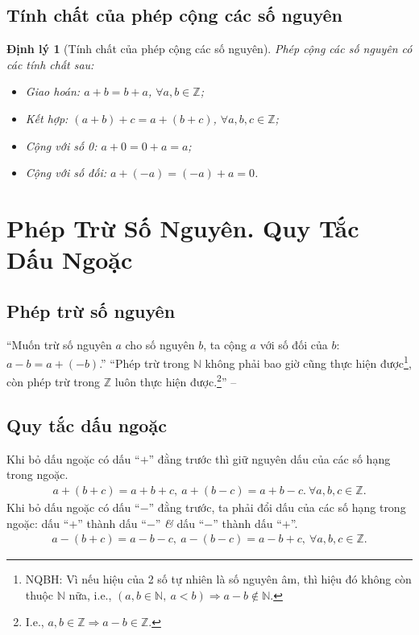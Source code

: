 \documentclass[oneside]{book}
\numberwithin{equation}{section}
\newtheorem{dinhly}{Định lý}[section]
\begin{document}
\subsection{Tính chất của phép cộng các số nguyên}

\begin{dinhly}[Tính chất của phép cộng các số nguyên]
	Phép cộng các số nguyên có các tính chất sau:
	\begin{itemize}
		\item Giao hoán: $a + b = b + a$, $\forall a,b\in\mathbb{Z}$;
		\item Kết hợp: $(a + b) + c = a + (b + c)$, $\forall a,b,c\in\mathbb{Z}$;
		\item Cộng với số 0: $a + 0 = 0 + a = a$;
		\item Cộng với số đối: $a + (-a) = (-a) + a = 0$.
	\end{itemize}
\end{dinhly}


\section{Phép Trừ Số Nguyên. Quy Tắc Dấu Ngoặc}

\subsection{Phép trừ số nguyên}
``Muốn trừ số nguyên $a$ cho số nguyên $b$, ta cộng $a$ với số đối của $b$: $a - b = a + (-b)$.'' ``Phép trừ trong $\mathbb{N}$ không phải bao giờ cũng thực hiện được\footnote{NQBH: Vì nếu hiệu của 2 số tự nhiên là số nguyên âm, thì hiệu đó không còn thuộc $\mathbb{N}$ nữa, i.e., $(a,b\in\mathbb{N},\ a < b)\Rightarrow a - b\notin\mathbb{N}$.}, còn phép trừ trong $\mathbb{Z}$ luôn thực hiện được.\footnote{I.e., $a,b\in\mathbb{Z}\Rightarrow a - b\in\mathbb{Z}$.}'' -- \cite[p. 76]{Thai_Anh_Dat_Ha_Loan_Nam_Quang_Toan_6_tap_1}

\subsection{Quy tắc dấu ngoặc}
Khi bỏ dấu ngoặc có dấu ``$+$'' đằng trước thì giữ nguyên dấu của các số hạng trong ngoặc.
\begin{align*}
	a + (b + c) = a + b + c,\ a + (b - c) = a + b - c.\ \forall a,b,c\in\mathbb{Z}.
\end{align*}
Khi bỏ dấu ngoặc có dấu ``$-$'' đằng trước, ta phải đổi dấu của các số hạng trong ngoặc: dấu ``$+$'' thành dấu ``$-$'' \textit{\&} dấu ``$-$'' thành dấu ``$+$''.
\begin{align*}
	a - (b + c) = a - b - c,\ a - (b - c) = a - b + c,\ \forall a,b,c\in\mathbb{Z}.
\end{align*}
\end{document}
